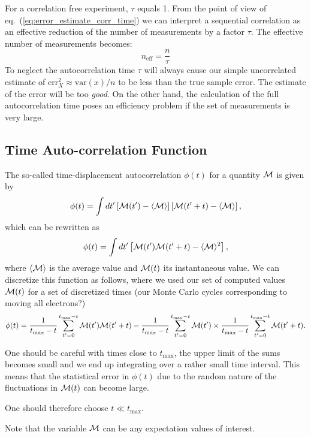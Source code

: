 \documentclass[graybox,sectrefs,envcountresetchap,open=right]{svmonodo}
\begin{document}
For a correlation free experiment, $\tau$
equals 1. From the point of view of
eq.~(\ref{eq:error_estimate_corr_time}) we can interpret a sequential
correlation as an effective reduction of the number of measurements by
a factor $\tau$. The effective number of measurements becomes:
\[
n_\mathrm{eff} = \frac{n}{\tau}
\]
To neglect the autocorrelation time $\tau$ will always cause our
simple uncorrelated estimate of $\mathrm{err}_X^2\approx \mathrm{var}(x)/n$ to
be less than the true sample error. The estimate of the error will be
too \emph{good}. On the other hand, the calculation of the full
autocorrelation time poses an efficiency problem if the set of
measurements is very large.







\subsection{Time Auto-correlation Function}

The so-called time-displacement autocorrelation $\phi(t)$ for a quantity ${\cal M}$ is given by
\[
\phi(t) = \int dt' \left[{\cal M}(t')-\langle {\cal M} \rangle\right]\left[{\cal M}(t'+t)-\langle {\cal M} \rangle\right],
\]
which can be rewritten as 
\[
\phi(t) = \int dt' \left[{\cal M}(t'){\cal M}(t'+t)-\langle {\cal M} \rangle^2\right],
\]
where $\langle {\cal M} \rangle$ is the average value and
${\cal M}(t)$ its instantaneous value. We can discretize this function as follows, where we used our
set of computed values ${\cal M}(t)$ for a set of discretized times (our Monte Carlo cycles corresponding to moving all electrons?)
\[
\phi(t)  = \frac{1}{t_{\mathrm{max}}-t}\sum_{t'=0}^{t_{\mathrm{max}}-t}{\cal M}(t'){\cal M}(t'+t)
-\frac{1}{t_{\mathrm{max}}-t}\sum_{t'=0}^{t_{\mathrm{max}}-t}{\cal M}(t')\times
\frac{1}{t_{\mathrm{max}}-t}\sum_{t'=0}^{t_{\mathrm{max}}-t}{\cal M}(t'+t).
\label{eq:phitf}
\]




One should be careful with times close to $t_{\mathrm{max}}$, the upper limit of the sums 
becomes small and we end up integrating over a rather small time interval. This means that the statistical
error in $\phi(t)$ due to the random nature of the fluctuations in ${\cal M}(t)$ can become large.

One should therefore choose $t \ll t_{\mathrm{max}}$.

Note that the variable ${\cal M}$ can be any expectation values of interest.
\end{document}
